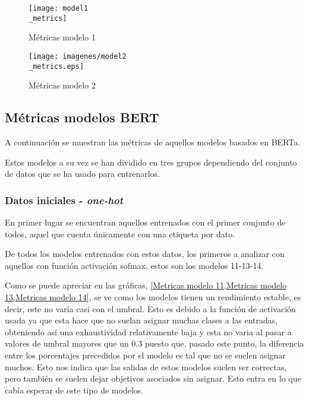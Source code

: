 \begin{figure}[H]
    \centering
    \texttt{[image: model1\\\_metrics]}
    \captionsetup{justification=centering}
    \caption{Métricas modelo 1}
    \label{Metricas modelo 1}
\end{figure}
\begin{figure}[H]
    \centering
    \texttt{[image: imagenes/model2\\\_metrics.eps]}
    \captionsetup{justification=centering}
    \caption{Métricas modelo 2}
    \label{Metricas modelo 2}
\end{figure}

\subsection{Métricas modelos BERT}A continuación se muestran las métricas de
aquellos modelos basados en \gls{BERTa}.

Estos modelos a su vez se han dividido en tres grupos dependiendo del conjunto
de datos que se ha usado para entrenarlos. 

\subsubsection[short]{Datos iniciales - \textit{one-hot}}
En primer lugar se encuentran aquellos entrenados con el primer conjunto de
todos, aquel que cuenta únicamente con una etiqueta por dato.

De todos los modelos entrenados con estos datos, los primeros a analizar con
aquellos con función activación sofmax, estos son los modelos 11-13-14.

Como se puede apreciar en las gráficas, \cref{Metricas modelo 11,Metricas modelo
13,Metricas modelo 14}, se ve como los modelos tienen un rendimiento estable, es
decir, este no varía casi con el umbral. Esto es debido a la función de
activación usada ya que esta hace que no suelan asignar muchas clases a las
entradas, obteniendo así una exhaustividad relativamente baja y esta no varia al
pasar a valores de umbral mayores que un 0.3 puesto que, pasado este punto, la
diferencia entre los porcentajes precedidos por el modelo es tal que no se
suelen asignar muchos. Esto nos indica que las salidas de estos modelos suelen
ser correctas, pero también se suelen dejar objetivos asociados sin asignar.
Esto entra en lo que cabía esperar de este tipo de modelos.

